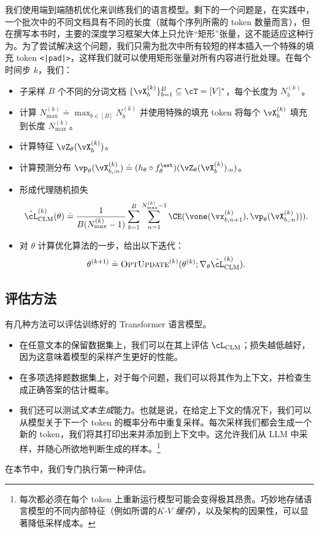 \documentclass[../../book-main_zh.tex]{subfiles}
\begin{document}
我们使用端到端随机优化来训练我们的语言模型。剩下的一个问题是，在实践中，一个批次中的不同文档具有不同的长度（就每个序列所需的 token 数量而言），但在撰写本书时，主要的深度学习框架大体上只允许“矩形”张量，这不能适应这种行为。为了尝试解决这个问题，我们只需为批次中所有较短的样本插入一个特殊的填充 token \texttt{<|pad|>}，这样我们就可以使用矩形张量对所有内容进行批处理。在每个时间步 \(k\)，我们：
\begin{itemize}
\item 子采样 \(B\) 个不同的分词文档 \(\{\vX_{b}^{(k)}\}_{b = 1}^{B} \subseteq \cT = [V]^{*}\)，每个长度为 \(N_{b}^{(k)}\)。
\item 计算 \(N_{\max}^{(k)} \doteq \max_{b \in [B]}N_{b}^{(k)}\) 并使用特殊的填充 token 将每个 \(\vX_{b}^{(k)}\) 填充到长度 \(N_{\max}^{(k)}\)。
\item 计算特征 \(\vZ_{\theta}(\vX_{b}^{(k)})\)。
\item 计算预测分布 \(\vp_{\theta}(\vX_{b,
        :n}^{(k)}) \doteq (h_{\theta} \circ
    f_{\theta}^{\ext})(\vZ_{\theta}(\vX_{b}^{(k)})_{:n})\)。
\item 形成代理随机损失
    \begin{equation}
        \hat{\cL}_{\mathrm{CLM}}^{(k)}(\theta) \doteq
        \frac{1}{B(N_{\max}^{(k)} - 1)}\sum_{b = 1}^{B}\sum_{n =
        1}^{N_{\max}^{(k)}-1}\CE(\vone(\vx_{b, n + 1}^{(k)}),
    \vp_{\theta}(\vX_{b, :n}^{(k)}))).
\end{equation}
\item 对 \(\theta\) 计算优化算法的一步，给出以下迭代：
\begin{equation}
    \theta^{(k + 1)} \doteq \textsc{OptUpdate}^{(k)}(\theta^{(k)};
    \nabla_{\theta}\hat{\cL}_{\mathrm{CLM}}^{(k)}).
\end{equation}
\end{itemize}

\subsection{评估方法} \label{sub:clm_text_evals}

有几种方法可以评估训练好的 Transformer 语言模型。
\begin{itemize}
\item 在任意文本的保留数据集上，我们可以在其上评估 \(\cL_{\mathrm{CLM}}\)；损失越低越好，因为这意味着模型的采样产生更好的性能。
\item 在多项选择题数据集上，对于每个问题，我们可以将其作为上下文，并检查生成正确答案的估计概率。
\item 我们还可以测试\textit{文本生成}能力。也就是说，在给定上下文的情况下，我们可以从模型关于下一个 token 的概率分布中重复采样。每次采样我们都会生成一个新的 token，我们将其打印出来并添加到上下文中。这允许我们从 LLM 中采样，并随心所欲地判断生成的样本。\footnote{每次都必须在每个 token 上重新运行模型可能会变得极其昂贵。巧妙地存储语言模型的不同内部特征（例如所谓的\textit{\(K\)-\(V\) 缓存}），以及架构的因果性，可以显著降低采样成本。}
\end{itemize}
在本节中，我们专门执行第一种评估。
\end{document}
